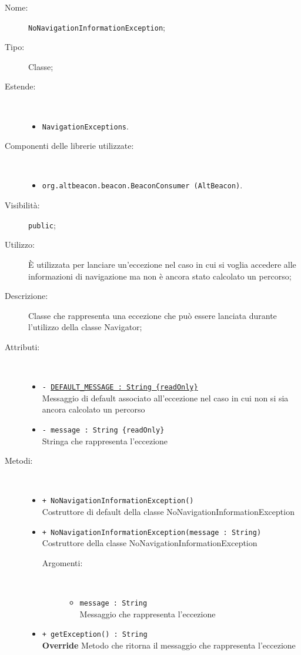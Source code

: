 \documentclass[../DefinizioneDiProdotto.tex]{subfiles}
\begin{document}
\begin{description}
	\item[Nome:] \texttt{NoNavigationInformationException};
	\item[Tipo:] Classe;
	\item[Estende:] \
	\begin{itemize}
		\item \texttt{NavigationExceptions}.
	\end{itemize}
	\item[Componenti delle librerie utilizzate:] \
	\begin{itemize}
		\item \texttt{org.altbeacon.beacon.BeaconConsumer (AltBeacon)}.
		
	\end{itemize}
	\item[Visibilità:] \texttt{public};
	\item[Utilizzo:] È utilizzata per lanciare un'eccezione nel caso in cui si voglia accedere alle informazioni di navigazione ma non è ancora stato calcolato un percorso;
	\item[Descrizione:] Classe che rappresenta una eccezione che può essere lanciata durante l'utilizzo della classe Navigator;
	\item[Attributi:] \
	\begin{itemize}
		\item \texttt{- \underline{DEFAULT\_MESSAGE : String \{readOnly\}}}\\
		Messaggio di default associato all'eccezione nel caso in cui non si sia ancora calcolato un percorso
		
		\item \texttt{- message : String \{readOnly\}}\\
		Stringa che rappresenta l'eccezione
		
	\end{itemize}
	\item[Metodi:] \
	\begin{itemize}
		\item \texttt{+ NoNavigationInformationException()}\\
		Costruttore di default della classe NoNavigationInformationException
		\item \texttt{+ NoNavigationInformationException(message : String)}\\
		Costruttore della classe NoNavigationInformationException
		\begin{description}
			\item[Argomenti:] \
			\begin{itemize}
				\item \texttt{message : String}\\
				Messaggio che rappresenta l'eccezione\end{itemize}
		\end{description}
		\item \texttt{+ getException() : String}\\
		\textbf{Override} Metodo che ritorna il messaggio che rappresenta l'eccezione
	\end{itemize}
\end{description}
\end{document}
